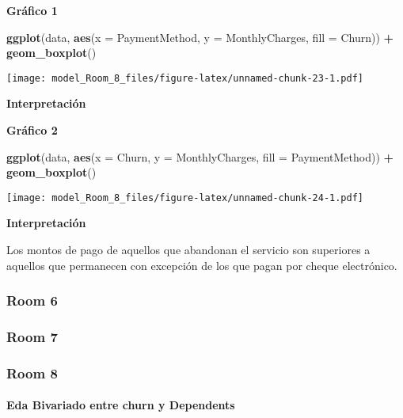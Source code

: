 \documentclass[
]{article}
\newenvironment{Shaded}{\begin{snugshade}}{\end{snugshade}}
\newcommand{\AttributeTok}[1]{\textcolor[rgb]{0.13,0.29,0.53}{#1}}
\newcommand{\FunctionTok}[1]{\textcolor[rgb]{0.13,0.29,0.53}{\textbf{#1}}}
\newcommand{\NormalTok}[1]{#1}
\newcommand{\SpecialCharTok}[1]{\textcolor[rgb]{0.81,0.36,0.00}{\textbf{#1}}}
\begin{document}
\textbf{Gráfico 1}

\begin{Shaded}
\begin{Highlighting}[]
\FunctionTok{ggplot}\NormalTok{(data, }\FunctionTok{aes}\NormalTok{(}\AttributeTok{x =}\NormalTok{ PaymentMethod, }\AttributeTok{y =}\NormalTok{ MonthlyCharges, }\AttributeTok{fill =}\NormalTok{ Churn)) }\SpecialCharTok{+}
  \FunctionTok{geom\_boxplot}\NormalTok{()}
\end{Highlighting}
\end{Shaded}

\texttt{[image: model\_Room\_8\_files/figure-latex/unnamed-chunk-23-1.pdf]}

\textbf{Interpretación}

\textbf{Gráfico 2}

\begin{Shaded}
\begin{Highlighting}[]
\FunctionTok{ggplot}\NormalTok{(data, }\FunctionTok{aes}\NormalTok{(}\AttributeTok{x =}\NormalTok{ Churn, }\AttributeTok{y =}\NormalTok{ MonthlyCharges, }\AttributeTok{fill =}\NormalTok{ PaymentMethod)) }\SpecialCharTok{+}
  \FunctionTok{geom\_boxplot}\NormalTok{()}
\end{Highlighting}
\end{Shaded}

\texttt{[image: model\_Room\_8\_files/figure-latex/unnamed-chunk-24-1.pdf]}

\textbf{Interpretación}

Los montos de pago de aquellos que abandonan el servicio son superiores
a aquellos que permanecen con excepción de los que pagan por cheque
electrónico.

\hypertarget{room-6}{%
\subsubsection{Room 6}\label{room-6}}

\hypertarget{room-7}{%
\subsubsection{Room 7}\label{room-7}}

\hypertarget{room-8}{%
\subsubsection{Room 8}\label{room-8}}

\hypertarget{eda-bivariado-entre-churn-y-dependents}{%
\paragraph{Eda Bivariado entre churn y
Dependents}\label{eda-bivariado-entre-churn-y-dependents}}
\end{document}
